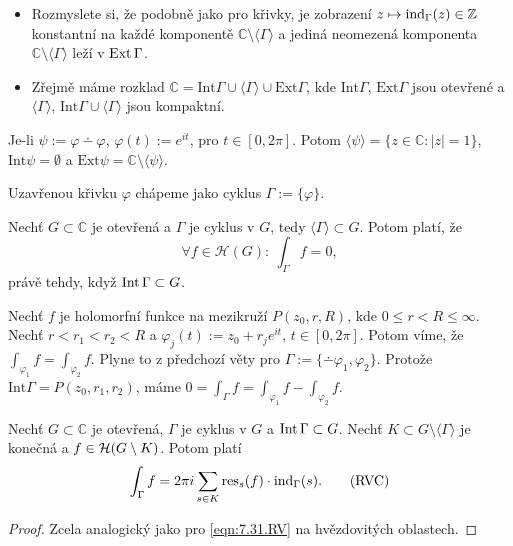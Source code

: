 \begin{note}
\begin{itemize}
    \item Rozmyslete si, že podobně jako pro křivky, je zobrazení $z\mapsto\operatorname{ind}_\Gamma(z)\in\operatorname{\mathbb{Z}}$ konstantní na každé komponentě $\mathbb{C}\setminus\langle\Gamma\rangle$ a jediná neomezená komponenta $\mathbb{C}\setminus\langle\Gamma\rangle$ leží v $\operatorname{Ext}\Gamma$.
    \item Zřejmě máme rozklad $\mathbb{C}=\text{Int}\Gamma\cup\langle\Gamma\rangle\cup\text{Ext} \Gamma$, kde $\text{Int} \Gamma$, $\text{Ext} \Gamma$ jsou otevřené a $\langle\Gamma\rangle$, $\text{Int} \Gamma\cup\langle\Gamma\rangle$ jsou kompaktní.
\end{itemize}
\end{note}

\begin{example}
Je-li $\psi:=\varphi\dotminus\varphi$, $\varphi(t):=e^{it}$, pro $t\in[0,2\pi]$. Potom $\langle\psi\rangle=\{z\in\mathbb{C}: |z|=1\}$, $\text{Int}\psi=\emptyset$ a $\text{Ext}\psi=\mathbb{C}\setminus\langle\psi\rangle$.
\end{example}

\begin{note}
Uzavřenou křivku $\varphi$ chápeme jako cyklus $\Gamma:=\{\varphi\}$.
\end{note}

\begin{theorem}\label{thm:obCapC}
Nechť $G\subset\mathbb{C}$ je otevřená a $\Gamma$ je cyklus v $G$, tedy $\langle\Gamma\rangle\subset G$. Potom platí, že
\begin{equation}
    \forall f\in\mathcal{H}(G):\ \int_\Gamma f =0,
    \tag{CV}
    \label{eqn:7.30.cv}
\end{equation}
právě tehdy, když $\operatorname{Int}\Gamma\subset G$.
\end{theorem}

\begin{example}
Nechť $f$ je holomorfní funkce na mezikruží $P(z_0,r,R)$, kde $0\leq r<R\leq\infty$. Nechť $r<r_1<r_2<R$ a $\varphi_j(t):=z_0+r_je^{it}$, $t\in[0,2\pi]$. Potom víme, že $\int_{\varphi_1}f=\int_{\varphi_2}f$. Plyne to z předchozí věty pro $\Gamma:=\{\dotminus\varphi_1,\varphi_2\}$. Protože $\text{Int}\Gamma=P(z_0,r_1,r_2)$, máme $0=\int_\Gamma f = \int_{\varphi_1}f-\int_{\varphi_2}f$.
\end{example}

\begin{theorem}
Nechť $G\subset\mathbb{C}$ je otevřená, $\Gamma$ je cyklus v $G$ a $\operatorname{Int}\Gamma\subset G$. Nechť $K\subset G\setminus\langle\Gamma\rangle$ je konečná  a $f\in\operatorname{\mathcal{H}}(G\setminus K)$. Potom platí
\begin{equation}
    \int_\Gamma f = 2\pi i  \sum_{s\in K}\text{res}_s(f)\cdot\operatorname{ind}_\Gamma(s).
    \tag{RVC}
    \label{eqn:9.8.rvc}
\end{equation}
\end{theorem}
\begin{proof}
Zcela analogický jako pro \cref{eqn:7.31.RV} na hvězdovitých oblastech.
\end{proof}
